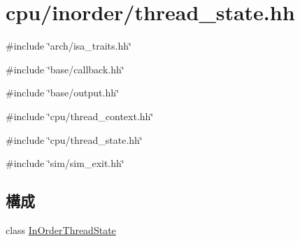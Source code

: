 \hypertarget{inorder_2thread__state_8hh}{
\section{cpu/inorder/thread\_\-state.hh}
\label{inorder_2thread__state_8hh}
}
{\ttfamily \#include \char`\"{}arch/isa\_\-traits.hh\char`\"{}}\par
{\ttfamily \#include \char`\"{}base/callback.hh\char`\"{}}\par
{\ttfamily \#include \char`\"{}base/output.hh\char`\"{}}\par
{\ttfamily \#include \char`\"{}cpu/thread\_\-context.hh\char`\"{}}\par
{\ttfamily \#include \char`\"{}cpu/thread\_\-state.hh\char`\"{}}\par
{\ttfamily \#include \char`\"{}sim/sim\_\-exit.hh\char`\"{}}\par
\subsection*{構成}
\begin{DoxyCompactItemize}
\item 
class \hyperlink{classInOrderThreadState}{InOrderThreadState}
\end{DoxyCompactItemize}
